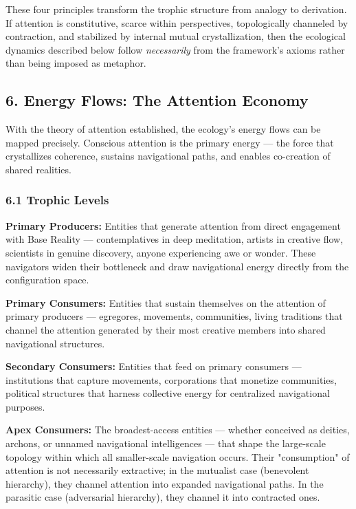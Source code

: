 These four principles transform the trophic structure from analogy to derivation. If attention is constitutive, scarce within perspectives, topologically channeled by contraction, and stabilized by internal mutual crystallization, then the ecological dynamics described below follow \textit{necessarily} from the framework's axioms rather than being imposed as metaphor.


\subsection*{6. Energy Flows: The Attention Economy}


With the theory of attention established, the ecology's energy flows can be mapped precisely. Conscious attention is the primary energy — the force that crystallizes coherence, sustains navigational paths, and enables co-creation of shared realities.


\subsubsection*{6.1 Trophic Levels}


\textbf{Primary Producers:} Entities that generate attention from direct engagement with Base Reality — contemplatives in deep meditation, artists in creative flow, scientists in genuine discovery, anyone experiencing awe or wonder. These navigators widen their bottleneck and draw navigational energy directly from the configuration space.


\textbf{Primary Consumers:} Entities that sustain themselves on the attention of primary producers — egregores, movements, communities, living traditions that channel the attention generated by their most creative members into shared navigational structures.


\textbf{Secondary Consumers:} Entities that feed on primary consumers — institutions that capture movements, corporations that monetize communities, political structures that harness collective energy for centralized navigational purposes.


\textbf{Apex Consumers:} The broadest-access entities — whether conceived as deities, archons, or unnamed navigational intelligences — that shape the large-scale topology within which all smaller-scale navigation occurs. Their "consumption" of attention is not necessarily extractive; in the mutualist case (benevolent hierarchy), they channel attention into expanded navigational paths. In the parasitic case (adversarial hierarchy), they channel it into contracted ones.


